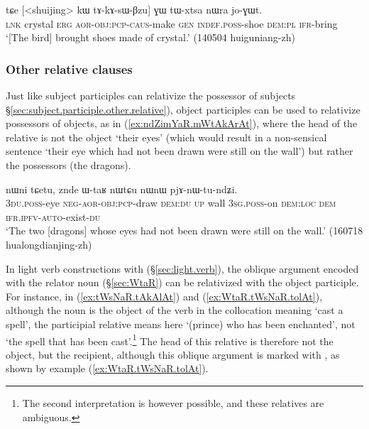 \begin{exe}
\ex \label{ex:tAkAsWBzu.GW.tWxtsa}
\gll  tɕe [<shuijing> kɯ tɤ-kɤ-sɯ-βzu] ɣɯ tɯ-xtsa nɯra jo-ɣɯt. \\
\textsc{lnk} crystal \textsc{erg} \textsc{aor}-\textsc{obj}:\textsc{pcp}-\textsc{caus}-make \textsc{gen} \textsc{indef}.\textsc{poss}-shoe \textsc{dem}:\textsc{pl} \textsc{ifr}-bring \\
\glt `[The bird] brought shoes made of crystal.' (140504 huiguniang-zh)
\end{exe}

\subsubsection{Other relative clauses}  \label{sec:object.participle.other.relative}
Just like subject participles can relativize the possessor of subjects §\ref{sec:subject.participle.other.relative}), object participles can be used to relativize possessors of objects, as in (\ref{ex:ndZimYaR.mWtAkArAt}), where the head of the relative  is not the object `their eyes' (which would result in a non-sensical sentence `their eye which had not been drawn were still on the wall') but rather the possessors (the dragons).

\begin{exe}
\ex \label{ex:ndZimYaR.mWtAkArAt}
 nɯni tɕetu, znde ɯ-taʁ nɯtɕu nɯnɯ pjɤ-nɯ-tu-ndʑi. \\
\textsc{3du}.\textsc{poss}-eye \textsc{neg}-\textsc{aor}-\textsc{obj}:\textsc{pcp}-draw \textsc{dem}:\textsc{du} \textsc{up} wall \textsc{3sg}.\textsc{poss}-on \textsc{dem}:\textsc{loc} \textsc{dem} \textsc{ifr}.\textsc{ipfv}-\textsc{auto}-exist-\textsc{du} \\
\glt `The two [dragons] whose eyes had not been drawn were still on the wall.' (160718 hualongdianjing-zh)
\end{exe}

In light verb constructions with  (§\ref{sec:light.verb}), the oblique argument encoded with the relator noun  (§\ref{sec:WtaR}) can be relativized with the object participle. For instance, in (\ref{ex:tWsNaR.tAkAlAt}) and (\ref{ex:WtaR.tWsNaR.tolAt}), although the noun  is the object of the verb  in the collocation meaning `cast a spell', the participial relative  means here  `(prince) who has been enchanted', not `the spell that has been cast'.\footnote{The second interpretation is however possible, and these relatives are ambiguous. } The head of this relative is therefore not the object, but the recipient, although this oblique argument is marked with , as shown by example (\ref{ex:WtaR.tWsNaR.tolAt}).

